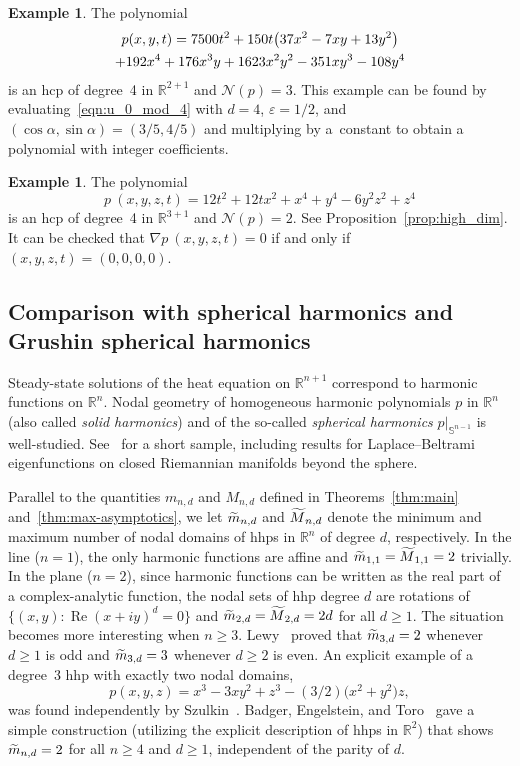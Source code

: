 \documentclass[10pt]{amsart}
\theoremstyle{definition}\newtheorem{defi}[theo]{Definition}\newtheorem{rema}[theo]{Remark}\newtheorem{exam}[theo]{Example}\newtheorem{exem}[theo]{Example}\newtheorem{nota}[theo]{Notation}
\DeclareMathOperator{\Ree}{Re}
\newcommand{\R}{\mathbb{R}}
\newcommand{\sphere}{\mathbb{S}}
\newcommand{\nodal}{\mathcal{N}}
\renewcommand{\epsilon}{\varepsilon}
\let\oldtilde\tilde
\renewcommand*{\tilde}[1]{\mathchoice{\widetilde{#1}}{\widetilde{#1}}{\oldtilde{#1}}{\oldtilde{#1}}}
\let\originalleft\left
\let\originalright\right
\renewcommand{\left}{\mathopen{}\mathclose\bgroup\originalleft}
\renewcommand{\right}{\aftergroup\egroup\originalright}
\begin{document}
\begin{exam}\label{eq:n2d4}
The polynomial
\begin{multline}
p(x,y,t)=7500 t^2 + 150t\left(37x^2-7xy+13y^2\right) \\
+ 192 x^4 + 176 x^3 y + 1623 x^2 y^2 - 351 x y^3 - 108 y^4
\end{multline}
is an hcp of degree~4 in $\R^{2+1}$ and $\nodal(p)=3$. This example can be found by evaluating~\eqref{eqn:u_0_mod_4} with $d=4$, $\epsilon=1/2$, and $(\cos\alpha,\sin\alpha)=(3/5,4/5)$ and multiplying by a~constant to obtain a polynomial with integer coefficients.
\end{exam}

\begin{exam}\label{eq:n3d4}
The polynomial
\begin{equation}
p~(x,y,z,t)=12t^2+12tx^2+x^4+y^4-6y^2z^2+z^4
\end{equation}
is an hcp of degree~4 in $\R^{3+1}$ and $\nodal(p)=2$. See Proposition~\ref{prop:high_dim}. It can be checked that $\nabla p~(x,y,z,t)=0$ if and only if $(x,y,z,t)=(0,0,0,0)$.
\end{exam}

\subsection{Comparison with spherical harmonics and Grushin spherical harmonics}\label{ss:harmonic}

Steady-state solutions of the heat equation on $\R^{n+1}$ correspond to harmonic functions on $\R^n$. Nodal geometry of homogeneous harmonic polynomials $p$ in $\R^n$ (also called \emph{solid harmonics}) and of the so-called \emph{spherical harmonics} $p|_{\sphere^{n-1}}$ is well-studied. See~\cite{EJN07, Logunov-annals1,Logunov-annals2,NS09} for a short sample, including results for Laplace--Beltrami eigenfunctions on closed Riemannian manifolds beyond the sphere.

Parallel to the quantities $m_{n,d}$ and $M_{n,d}$ defined in Theorems~\ref{thm:main} and~\ref{thm:max-asymptotics}, we let $\tilde m_{n,d}$ and $\tilde M_{n,d}$ denote the minimum and maximum number of nodal domains of hhps in $\R^n$ of degree $d$, respectively. In the line ($n=1$), the only harmonic functions are affine and $\tilde m_{1,1}=\tilde M_{1,1}=2$ trivially. In the plane ($n=2$), since harmonic functions can be written as the real part of a complex-analytic function, the nodal sets of hhp degree $d$ are rotations of $\{(x,y):\Ree(x+iy)^d=0\}$ and $\tilde m_{2,d}=\tilde M_{2,d}=2d$ for all $d\geq 1$. The situation becomes more interesting when $n\geq 3$. Lewy~\cite{Lewy77} proved that $\tilde m_{3,d}=2$ whenever $d\geq 1$ is odd and $\tilde m_{3,d}=3$ whenever $d\geq 2$ is even. An explicit example of a degree~3 hhp with exactly two nodal domains,
\begin{equation}
p(x,y,z) = x^3 - 3xy^2 + z^3 - (3/2)\bigl(x^2 + y^2\bigr)z,
\end{equation}
was found independently by Szulkin~\cite{Szulkin78}. Badger, Engelstein, and Toro~\cite{BET17} gave a simple construction (utilizing the explicit description of hhps in $\R^2$) that shows $\tilde m_{n,d}=2$ for all $n\geq 4$ and $d\geq 1$, independent of the parity of $d$.
\end{document}
